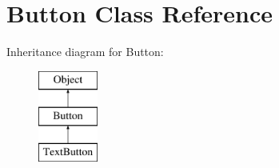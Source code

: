 \hypertarget{class_button}{}\section{Button Class Reference}
\label{class_button}
Inheritance diagram for Button\+:\begin{figure}[H]
\begin{center}
\leavevmode
\includegraphics[height=3.000000cm]{class_button}
\end{center}
\end{figure}

